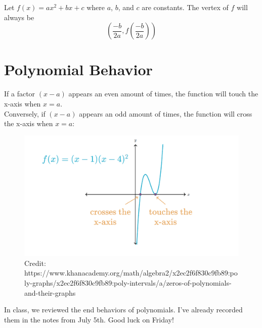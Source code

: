 \documentclass[12pt]{article}
\begin{document}
Let \(f(x)=ax^2+bx+c\) where \(a\), \(b\), and \(c\) are constants. The vertex of \(f\) will always be\\

\[\left(\frac{-b}{2a}, f\left(\frac{-b}{2a}\right)\right)\]

\section{Polynomial Behavior}

If a factor \((x-a)\) appears an even amount of times, the function will touch the x-axis when \(x=a\).\\

Conversely, if \((x-a)\) appears an odd amount of times, the function will cross the x-axis when \(x=a\):

\begin{figure}[H]
	\centering
	\includegraphics[scale=1]{Polynomial touching.png}
	\caption{Credit: https://www.khanacademy.org/math/algebra2/x2ec2f6f830c9fb89:poly-graphs/x2ec2f6f830c9fb89:poly-intervals/a/zeros-of-polynomials-and-their-graphs}
\end{figure}

In class, we reviewed the end behaviors of polynomials. I've already recorded them in the notes from July 5th. Good luck on Friday!
\end{document}
